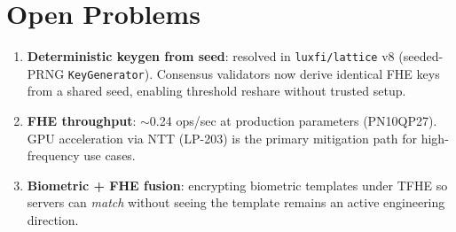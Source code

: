 \section{Open Problems}


\begin{enumerate}[nosep]
  \item \textbf{Deterministic keygen from seed}: resolved in
        \texttt{luxfi/lattice} v8 (seeded-PRNG \texttt{KeyGenerator}).
        Consensus validators now derive identical FHE keys from a shared
        seed, enabling threshold reshare without trusted setup.
  \item \textbf{FHE throughput}: $\sim$0.24 ops/sec at production
        parameters (PN10QP27). GPU acceleration via NTT (LP-203) is the
        primary mitigation path for high-frequency use cases.
  \item \textbf{Biometric + FHE fusion}: encrypting biometric templates
        under TFHE so servers can \emph{match} without seeing the
        template remains an active engineering direction.
\end{enumerate}


